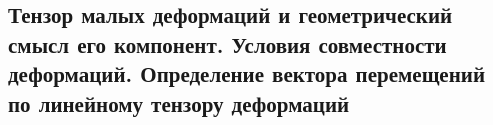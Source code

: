 

\subsection{Тензор малых деформаций и геометрический смысл его компонент. Условия совместности деформаций. Определение вектора перемещений по линейному тензору деформаций}



